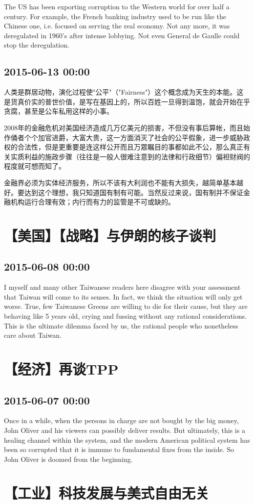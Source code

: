 \documentclass[twocolumn]{ctexart}
\begin{document}
The US has been exporting corruption to the Western world for over half a century. For example, the French banking industry used to be run like the Chinese one, i.e. focused on serving the real economy. Not any more, it was deregulated in 1960's after intense lobbying. Not even General de Gaulle could stop the deregulation.\subsection*{2015-06-13 00:00}
人类是群居动物，演化过程使"公平"（"Fairness"）这个概念成为天生的本能。这是货真价实的普世价值，是写在基因上的，所以百姓一旦得到温饱，就会开始在乎贪腐，甚至是公车私用这样的小事。

2008年的金融危机对美国经济造成几万亿美元的损害，不但没有事后算帐，而且始作俑者个个加官进爵，大富大贵，这一方面消灭了社会的公平假象，进一步威胁政权的合法性，但是更重要是连这样公开而且万眾瞩目的事都如此不公，那么真正有关实质利益的施政步骤（往往是一般人很难注意到的法律和行政细节）偏袒财阀的程度就可想而知了。

金融界必须为实体经济服务，所以不该有大利润也不能有大损失，越简单基本越好。要达到这个理想，我只知道国有制有可能。当然反过来说，国有制并不保证金融机构运行合理有效；内行而有力的监管是不可或缺的。\section*{【美国】【战略】与伊朗的核子谈判}
\subsection*{2015-06-08 00:00}
I myself and many other Taiwanese readers here disagree with your assessment that Taiwan will come to its senses. In fact, we think the situation will only get worse. True, few Taiwanese Greens are willing to die for their cause, but they are behaving like 5 years old, crying and fussing without any rational considerations. This is the ultimate dilemma faced by us, the rational people who nonetheless care about Taiwan.\section*{【经济】再谈TPP}
\subsection*{2015-06-07 00:00}
Once in a while, when the persons in charge are not bought by the big money, John Oliver and his viewers can possibly deliver results. But ultimately, this is a healing channel within the system, and the modern American political system has been so corrupted that it is immune to fundamental fixes from the inside. So John Oliver is doomed from the beginning.\section*{【工业】科技发展与美式自由无关}
\end{document}

